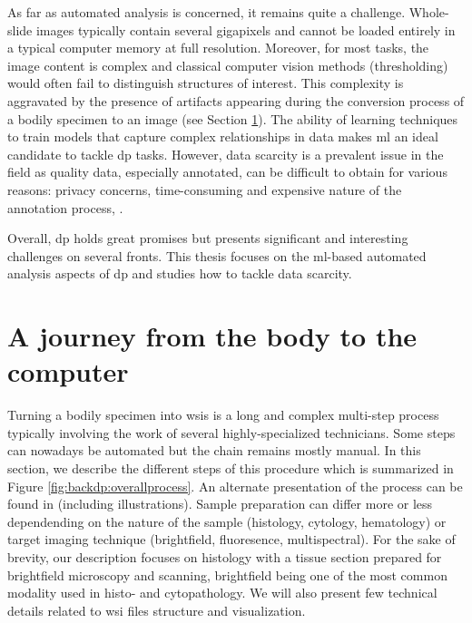 As far as automated analysis is concerned, it remains quite a challenge. Whole-slide images typically contain several gigapixels and cannot be loaded entirely in a typical computer memory at full resolution. Moreover, for most tasks, the image content is complex and classical computer vision methods (\eg thresholding) would often fail to distinguish structures of interest. This complexity is aggravated by the presence of artifacts \parencite{taqi2018review} appearing during the conversion process of a bodily specimen to an image (see Section \ref{sec:backdp:wsi}). The ability of learning techniques to train models that capture complex relationships in data makes \acrlong{ml} an ideal candidate to tackle \acrlong{dp} tasks. However, data scarcity is a prevalent issue in the field as quality data, especially annotated, can be difficult to obtain for various reasons: privacy concerns, time-consuming and expensive nature of the annotation process, \etc.     

Overall, \acrlong{dp} holds great promises but presents significant and interesting challenges on several fronts. This thesis focuses on the \acrshort{ml}-based automated analysis aspects of \acrlong{dp} and studies how to tackle data scarcity.

\section{A journey from the body to the computer}
\label{sec:backdp:wsi}

Turning a bodily specimen into \acrlong{wsi}s is a long and complex multi-step process typically involving the work of several highly-specialized technicians. Some steps can nowadays be automated but the chain remains mostly manual. In this section, we describe the different steps of this procedure which is summarized in Figure \ref{fig:backdp:overallprocess}. An alternate presentation of the process can be found in \parencite{mccann2014automated} (including illustrations). Sample preparation can differ more or less dependending on the nature of the sample (\eg histology, cytology, hematology) or target imaging technique (\eg brightfield, fluoresence, multispectral). For the sake of brevity, our description focuses on histology with a tissue section prepared for brightfield microscopy and scanning, brightfield being one of the most common modality used in histo- and cytopathology. We will also present few technical details related to \acrshort{wsi} files structure and visualization. 

